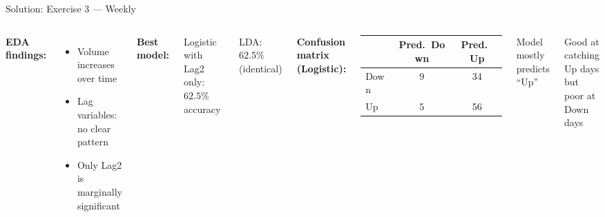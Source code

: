 \documentclass[aspectratio=169, 11pt]{beamer}
\begin{document}
\begin{frame}{Solution: Exercise 3 --- Weekly}
\begin{columns}
\textbf{EDA findings:}
\begin{itemize}
  \item Volume increases over time
  \item Lag variables: no clear pattern
  \item Only Lag2 is marginally significant
\end{itemize}

\vspace{0.3em}
\textbf{Best model:}

Logistic with Lag2 only: $62.5\%$ accuracy

LDA: $62.5\%$ (identical)

\textbf{Confusion matrix (Logistic):}

\vspace{0.3em}
\begin{tabular}{lcc}
\toprule
 & Pred.\ Down & Pred.\ Up \\
\midrule
Down & 9 & 34 \\
Up & 5 & 56 \\
\bottomrule
\end{tabular}

\vspace{0.3em}
Model mostly predicts ``Up''

Good at catching Up days\\
but poor at Down days
\end{columns}
\end{frame}
\end{document}
